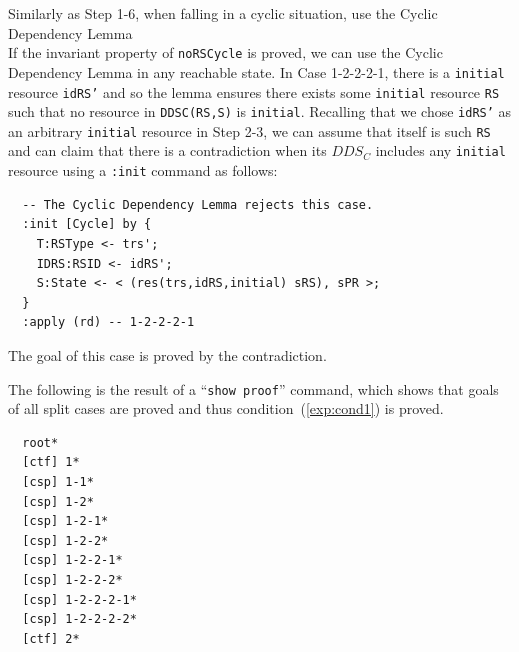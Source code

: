 \documentclass[12pt]{report}
\newcommand{\stt}[1]{{\small{\tt {#1}}}}
\begin{document}
 Similarly as Step 1-6, when falling in a
cyclic situation, use the Cyclic Dependency Lemma \\
If the invariant property of {\tt noRSCycle} is proved, we can use the
Cyclic Dependency Lemma in any reachable state. In Case 1-2-2-2-1,
there is a {\tt initial} resource {\tt idRS'} and so the lemma ensures
there exists some {\tt initial} resource {\tt RS} such that no
resource in \stt{DDSC(RS,S)} is {\tt initial}. Recalling that we chose
{\tt idRS'} as an arbitrary {\tt initial} resource in Step 2-3, we can
assume that itself is such {\tt RS} and can claim that there is a
contradiction when its $DDS_C$ includes any {\tt initial} resource
using a {\tt :init} command as follows:
\small
\begin{verbatim}
  -- The Cyclic Dependency Lemma rejects this case.
  :init [Cycle] by {
    T:RSType <- trs';
    IDRS:RSID <- idRS';
    S:State <- < (res(trs,idRS,initial) sRS), sPR >;
  }
  :apply (rd) -- 1-2-2-2-1
\end{verbatim}
\normalsize
The goal of this case is proved by the contradiction.

The following is the result of a ``\stt{show proof}'' command, which shows
that goals of all split cases are proved and thus
condition~(\ref{exp:cond1}) is proved.
\small
\begin{verbatim}
  root*
  [ctf] 1*
  [csp] 1-1*
  [csp] 1-2*
  [csp] 1-2-1*
  [csp] 1-2-2*
  [csp] 1-2-2-1*
  [csp] 1-2-2-2*
  [csp] 1-2-2-2-1*
  [csp] 1-2-2-2-2*
  [ctf] 2*
\end{verbatim}
\normalsize
\end{document}
